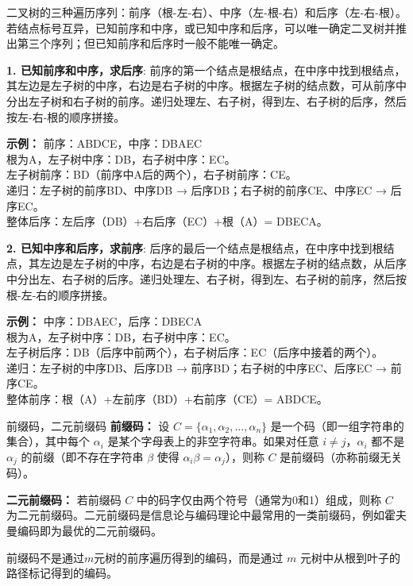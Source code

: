 \documentclass[lang=cn,11pt]{elegantbook}
\begin{document}
二叉树的三种遍历序列：前序（根-左-右）、中序（左-根-右）和后序（左-右-根）。若结点标号互异，已知前序和中序，或已知中序和后序，可以唯一确定二叉树并推出第三个序列；但已知前序和后序时一般不能唯一确定。

    \textbf{1. 已知前序和中序，求后序}:
    前序的第一个结点是根结点，在中序中找到根结点，其左边是左子树的中序，右边是右子树的中序。根据左子树的结点数，可从前序中分出左子树和右子树的前序。递归处理左、右子树，得到左、右子树的后序，然后按左-右-根的顺序拼接。

    \textbf{示例：}
    前序：ABDCE，中序：DBAEC \\
    根为A，左子树中序：DB，右子树中序：EC。 \\
    左子树前序：BD（前序中A后的两个），右子树前序：CE。 \\
    递归：左子树的前序BD、中序DB → 后序DB；右子树的前序CE、中序EC → 后序EC。 \\
    整体后序：左后序（DB）+右后序（EC）+根（A）= DBECA。

    \textbf{2. 已知中序和后序，求前序}:
    后序的最后一个结点是根结点，在中序中找到根结点，其左边是左子树的中序，右边是右子树的中序。根据左子树的结点数，从后序中分出左、右子树的后序。递归处理左、右子树，得到左、右子树的前序，然后按根-左-右的顺序拼接。

    \textbf{示例：}
    中序：DBAEC，后序：DBECA \\
    根为A，左子树中序：DB，右子树中序：EC。 \\
    左子树后序：DB（后序中前两个），右子树后序：EC（后序中接着的两个）。 \\
    递归：左子树的中序DB、后序DB → 前序BD；右子树的中序EC、后序EC → 前序CE。 \\
    整体前序：根（A）+左前序（BD）+右前序（CE）= ABDCE。

\begin{definition}{前缀码，二元前缀码}
\textbf{前缀码：} 设 $C = \{\alpha_1, \alpha_2, \dots, \alpha_n\}$ 是一个码（即一组字符串的集合），其中每个 $\alpha_i$ 是某个字母表上的非空字符串。如果对任意 $i \neq j$，$\alpha_i$ 都不是 $\alpha_j$ 的前缀（即不存在字符串 $\beta$ 使得 $\alpha_i \beta = \alpha_j$），则称 $C$ 是前缀码（亦称前缀无关码）。

\textbf{二元前缀码：} 若前缀码 $C$ 中的码字仅由两个符号（通常为0和1）组成，则称 $C$ 为二元前缀码。二元前缀码是信息论与编码理论中最常用的一类前缀码，例如霍夫曼编码即为最优的二元前缀码。
\end{definition}
前缀码不是通过$m$元树的前序遍历得到的编码，而是通过 $m$ 元树中从根到叶子的路径标记得到的编码。
\end{document}
